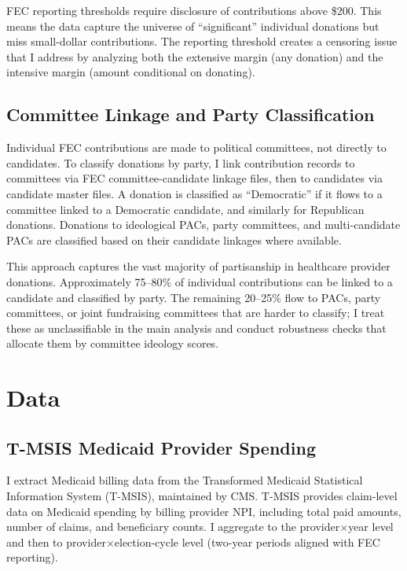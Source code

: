 \documentclass[12pt]{article}
\begin{document}
FEC reporting thresholds require disclosure of contributions above \$200. This means the data capture the universe of ``significant'' individual donations but miss small-dollar contributions. The reporting threshold creates a censoring issue that I address by analyzing both the extensive margin (any donation) and the intensive margin (amount conditional on donating).

\subsection{Committee Linkage and Party Classification}

Individual FEC contributions are made to political committees, not directly to candidates. To classify donations by party, I link contribution records to committees via FEC committee-candidate linkage files, then to candidates via candidate master files. A donation is classified as ``Democratic'' if it flows to a committee linked to a Democratic candidate, and similarly for Republican donations. Donations to ideological PACs, party committees, and multi-candidate PACs are classified based on their candidate linkages where available.

This approach captures the vast majority of partisanship in healthcare provider donations. Approximately 75--80\% of individual contributions can be linked to a candidate and classified by party. The remaining 20--25\% flow to PACs, party committees, or joint fundraising committees that are harder to classify; I treat these as unclassifiable in the main analysis and conduct robustness checks that allocate them by committee ideology scores.


\section{Data}\label{sec:data}

\subsection{T-MSIS Medicaid Provider Spending}

I extract Medicaid billing data from the Transformed Medicaid Statistical Information System (T-MSIS), maintained by CMS. T-MSIS provides claim-level data on Medicaid spending by billing provider NPI, including total paid amounts, number of claims, and beneficiary counts. I aggregate to the provider$\times$year level and then to provider$\times$election-cycle level (two-year periods aligned with FEC reporting).
\end{document}
